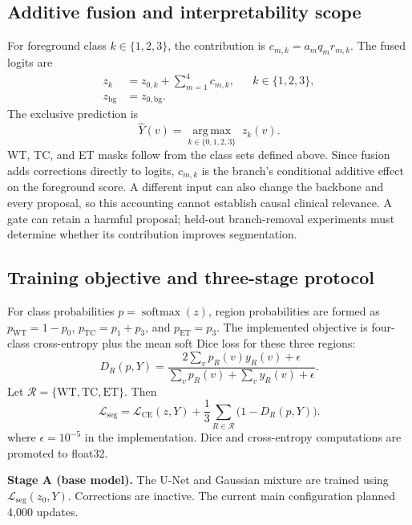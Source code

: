 \documentclass[conference]{IEEEtran}
\begin{document}
\subsection{Additive fusion and interpretability scope}
For foreground class $k\in\{1,2,3\}$, the contribution is $c_{m,k}=a_m q_m r_{m,k}$. The fused logits are
\begin{equation}
\begin{aligned}
z_k&=z_{0,k}+\sum_{m=1}^{4}c_{m,k}, && k\in\{1,2,3\},\\
z_{\mathrm{bg}}&=z_{0,\mathrm{bg}}.
\end{aligned}
\label{eq:fusion}
\end{equation}
The exclusive prediction is
\begin{equation}
\hat Y(v)=\underset{k\in\{0,1,2,3\}}{\operatorname{arg\,max}}\;z_k(v).
\label{eq:prediction}
\end{equation}
WT, TC, and ET masks follow from the class sets defined above. Since fusion adds corrections directly to logits, $c_{m,k}$ is the branch's conditional additive effect on the foreground score. A different input can also change the backbone and every proposal, so this accounting cannot establish causal clinical relevance. A gate can retain a harmful proposal; held-out branch-removal experiments must determine whether its contribution improves segmentation.

\subsection{Training objective and three-stage protocol}
For class probabilities $p=\operatorname{softmax}(z)$, region probabilities are formed as $p_{\mathrm{WT}}=1-p_0$, $p_{\mathrm{TC}}=p_1+p_3$, and $p_{\mathrm{ET}}=p_3$. The implemented objective is four-class cross-entropy plus the mean soft Dice loss for these three regions:
\begin{equation}
D_R(p,Y)=\frac{2\sum_v p_R(v)y_R(v)+\epsilon}
{\sum_v p_R(v)+\sum_v y_R(v)+\epsilon}.
\label{eq:softdice}
\end{equation}
Let $\mathcal R=\{\mathrm{WT},\mathrm{TC},\mathrm{ET}\}$. Then
\begin{equation}
\mathcal L_{\mathrm{seg}}=\mathcal L_{\mathrm{CE}}(z,Y)
+\frac{1}{3}\sum_{R\in\mathcal R}\bigl(1-D_R(p,Y)\bigr).
\label{eq:seg}
\end{equation}
where $\epsilon=10^{-5}$ in the implementation. Dice and cross-entropy computations are promoted to float32.

\textbf{Stage A (base model).} The U-Net and Gaussian mixture are trained using $\mathcal L_{\mathrm{seg}}(z_0,Y)$. Corrections are inactive. The current main configuration planned 4,000 updates.
\end{document}
